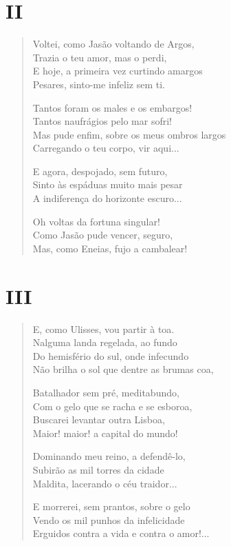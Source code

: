 \medskip
\section{II}

\begin{verse}
Voltei, como Jasão voltando de Argos,\\
Trazia o teu amor, mas o perdi,\\
E hoje, a primeira vez curtindo amargos\\
Pesares, sinto-me infeliz sem ti.

Tantos foram os males e os embargos!\\
Tantos naufrágios pelo mar sofri!\\
Mas pude enfim, sobre os meus ombros largos\\
Carregando o teu corpo, vir aqui...

E agora, despojado, sem futuro,\\
Sinto às espáduas muito mais pesar\\
A indiferença do horizonte escuro...

Oh voltas da fortuna singular!\\
Como Jasão pude vencer, seguro,\\
Mas, como Eneias, fujo a cambalear!
\end{verse}

\medskip
\section{III}

\begin{verse}
E, como Ulisses, vou partir à toa.\\
Nalguma landa regelada, ao fundo\\
Do hemisfério do sul, onde infecundo\\
Não brilha o sol que dentre as brumas coa,

Batalhador sem pré, meditabundo,\\
Com o gelo que se racha e se esboroa,\\
Buscarei levantar outra Lisboa,\\
Maior! maior! a capital do mundo!

Dominando meu reino, a defendê-lo,\\
Subirão as mil torres da cidade\\
Maldita, lacerando o céu traidor...

E morrerei, sem prantos, sobre o gelo\\
Vendo os mil punhos da infelicidade\\
Erguidos contra a vida e contra o amor!...
\end{verse}


